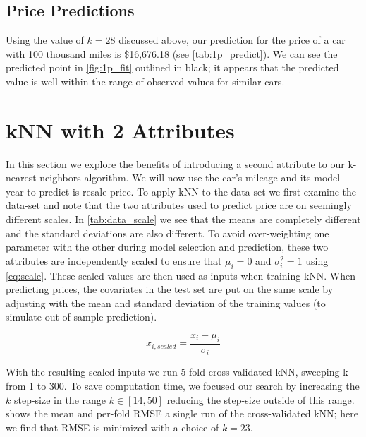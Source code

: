 \documentclass[11pt, fleqn]{article}
\begin{document}


\subsection{Price Predictions}

Using the value of $k=28$ discussed above, our prediction for the price of a car with 100 thousand miles is \$16,676.18 (see \cref{tab:1p_predict}). We can see the predicted point in \cref{fig:1p_fit} outlined in black; it appears that the predicted value is well within the range of observed values for similar cars.



\section{kNN with 2 Attributes}\label{sec:2p}

In this section we explore the benefits of introducing a second attribute to our k-nearest neighbors algorithm. We will now use the car's mileage and its model year to predict is resale price.  To apply kNN to the data set we first examine the data-set and note that the two attributes used to predict price are on seemingly different scales.  In \cref{tab:data_scale} we see that the means are completely different and the standard deviations are also different. To avoid over-weighting one parameter with the other during model selection and prediction, these two attributes are independently scaled to ensure that $\mu_i=0$ and $\sigma_i^2=1$ using \cref{eq:scale}.  These scaled values are then used as inputs when training kNN.  When predicting prices, the covariates in the test set are put on the same scale by adjusting with the mean and standard deviation of the training values (to simulate out-of-sample prediction).

\begin{equation}\label{eq:scale}
x_{i,scaled} = \frac{x_i-\mu_i}{\sigma_i} 
\end{equation}



With the resulting scaled inputs we run 5-fold cross-validated kNN, sweeping k from 1 to 300.  To save computation time, we focused our search by increasing the $k$ step-size in the range $k\in[14,50]$ reducing the step-size outside of this range.  shows the mean and per-fold RMSE a single run of the cross-validated kNN; here we find that RMSE is minimized with a choice of $k=23$.
\end{document}
